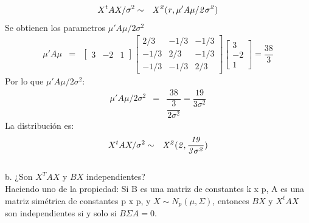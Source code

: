 \documentclass[12pt,a4paper]{report}
\begin{document}
\begin{enumerate}
		\begin{eqnarray*}
			X^{t}AX/\sigma^{2}&\sim& \it{X^{2}}(r,\mu'A\mu/2\sigma^{2})
		\end{eqnarray*}
		Se obtienen los parametros $\mu'A\mu/2\sigma^{2}$\\		
		\begin{eqnarray*}
			\mu'A\mu &=&\begin{bmatrix}
				3 & -2 & 1
			\end{bmatrix}	 
			\begin{bmatrix}
				2/3 & -1/3 & -1/3\\
				-1/3 & 2/3 & -1/3\\
				-1/3 & -1/3 & 2/3
			\end{bmatrix}
			\begin{bmatrix}
				3 \\
				-2  \\
				1 
			\end{bmatrix}=\dfrac{38}{3}			
		\end{eqnarray*}
		Por lo que $\mu'A\mu/2\sigma^{2}$:
		\begin{eqnarray*}
			\mu'A\mu/2\sigma^{2}&=&\dfrac{38}{\dfrac{3}{2\sigma^{2}}}=\dfrac{19}{3\sigma^{2}}
		\end{eqnarray*}
		La distribución es:
		\begin{eqnarray*}
		X^{t}AX/\sigma^{2}&\sim& \it{X^{2}}(2,\dfrac{19}{3\sigma^{2}})
		\end{eqnarray*}
		\\

b. ¿Son $X^TAX$ y $BX$ independientes?\\

Haciendo uno de la propiedad: Si B es una matriz de constantes k x p, A es una matriz simétrica de constantes p x p, y $X\sim N_{p}(\mu, \Sigma)$, entonces $BX$ y $X^{t}AX$ son independientes si y solo si $B\Sigma A=0$.
		

\end{enumerate}
\end{document}
